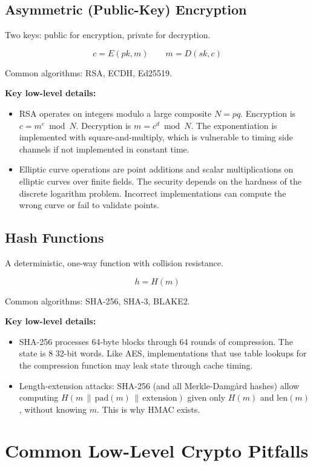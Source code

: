 \subsection{Asymmetric (Public-Key) Encryption}

Two keys: public for encryption, private for decryption.

\[
	c = E(pk, m) \quad\quad m = D(sk, c)
\]

Common algorithms: RSA, ECDH, Ed25519.

\textbf{Key low-level details:}
\begin{itemize}
	\item RSA operates on integers modulo a large composite \(N = pq\). Encryption is \(c = m^e \bmod N\). Decryption is \(m = c^d \bmod N\). The exponentiation is implemented with square-and-multiply, which is vulnerable to timing side channels if not implemented in constant time.
	\item Elliptic curve operations are point additions and scalar multiplications on elliptic curves over finite fields. The security depends on the hardness of the discrete logarithm problem. Incorrect implementations can compute the wrong curve or fail to validate points.
\end{itemize}

\subsection{Hash Functions}

A deterministic, one-way function with collision resistance.

\[
	h = H(m)
\]

Common algorithms: SHA-256, SHA-3, BLAKE2.

\textbf{Key low-level details:}
\begin{itemize}
	\item SHA-256 processes 64-byte blocks through 64 rounds of compression. The state is 8 32-bit words. Like AES, implementations that use table lookups for the compression function may leak state through cache timing.
	\item Length-extension attacks: SHA-256 (and all Merkle-Damgård hashes) allow computing \(H(m \,\|\, \text{pad}(m) \,\|\, \text{extension})\) given only \(H(m)\) and \(\text{len}(m)\), without knowing \(m\). This is why HMAC exists.
\end{itemize}

\section{Common Low-Level Crypto Pitfalls}

